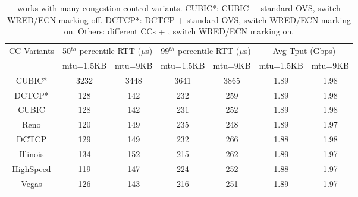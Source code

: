 \begin{table}[!t]
\tiny
\begin{center}
\begin{tabular}{ |c|c|c|c|c|c|c| }
 \hline
 \multirow{2}{*}{CC Variants} & \multicolumn{2}{|c|}{50$^{th}$ percentile RTT ($\mu$s)} & \multicolumn{2}{|c|}{99$^{th}$ percentile RTT ($\mu$s)} & \multicolumn{2}{|c|}{Avg Tput (Gbps)}\\
 \cline{2-7}
       &  mtu=1.5KB & mtu=9KB & mtu=1.5KB & mtu=9KB & mtu=1.5KB & mtu=9KB \\
 \hline
 \hline
 CUBIC* &  3232     &   3448    &   3641     &  3865     &   1.89    & 1.98   \\
 DCTCP* &  128      &   142    &   232    &   259    &   1.89    &   1.98  \\
 \hline
 \hline
 CUBIC &   128     &   142    &    231    &   252    &   1.89    &  1.98   \\
 Reno  &   120     &   149    &    235    &   248    &   1.89    &  1.97   \\
DCTCP  &   129     &   149    &    232    &   266    &   1.88    &  1.98    \\
Illinois  &   134     &   152    &    215    &  262     &   1.89    &  1.97    \\
HighSpeed  &   119     &  147     &    224    &  252     &   1.88    & 1.97     \\
 Vegas  &   126     &   143    &    216    &    251   &   1.89    &  1.97   \\

 \hline

\end{tabular}
\caption{\acdc{} works with many congestion control variants.
        CUBIC*: CUBIC + standard OVS, switch WRED/ECN marking off.
        DCTCP*: DCTCP + standard OVS, switch WRED/ECN marking on.
        Others: different CCs + \acdc{}, switch WRED/ECN marking on.}
\label{other_cc_variants}
\end{center}
\end{table}

